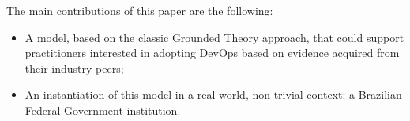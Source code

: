 The main contributions of this paper are the following:

\begin{itemize}
\item A model, based on the classic Grounded Theory approach, that could support practitioners interested in adopting DevOps based on evidence acquired from their industry peers;
\item An instantiation of this model in a real world, non-trivial context: a Brazilian Federal Government institution.
\end{itemize}


